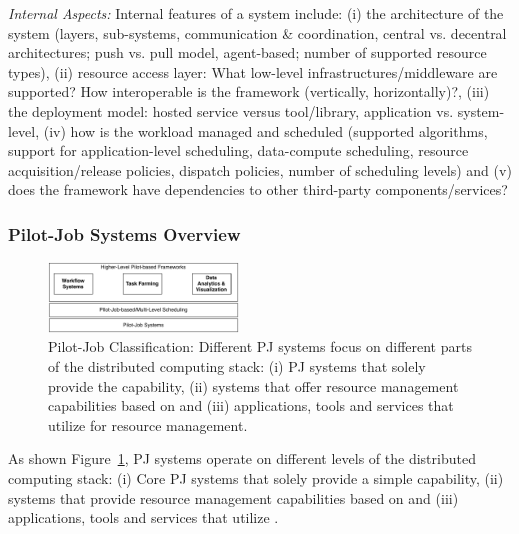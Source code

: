 \documentclass{sig-alternate}
\begin{document}
\emph{Internal Aspects:} Internal features of a \pilotjob system include: (i)
the architecture of the system (layers, sub-systems, communication \&
coordination, central vs. decentral architectures; push vs. pull model,
agent-based; number of supported resource types), (ii) resource access layer:
What low-level infrastructures/middleware are supported? How interoperable is
the framework (vertically, horizontally)?, (iii) the deployment model: hosted
service versus tool/library, application vs. system-level, (iv) how is the
workload managed and scheduled (supported algorithms, support for
application-level scheduling, data-compute scheduling, resource
acquisition/release policies, dispatch policies, number of scheduling levels)
and (v) does the framework have dependencies to other third-party
components/services?



\subsubsection{Pilot-Job Systems Overview}

\begin{figure}[t]
	\centering
		\includegraphics[width=0.45\textwidth]{figures/classification}
	\caption{Pilot-Job Classification: Different PJ systems focus
          on different parts of the distributed computing stack: (i)
          PJ systems that solely provide the \pilot capability, (ii)
          systems that offer resource management capabilities based on
          \pilots and (iii) applications, tools and services that
          utilize \pilots for resource management. }
	\label{fig:figures_classification}
\end{figure}


As shown Figure~\ref{fig:figures_classification}, PJ systems operate
on different levels of the distributed computing stack: (i) Core PJ
systems that solely provide a simple \pilot capability, (ii) systems
that provide resource management capabilities based on \pilots and
(iii) applications, tools and services that utilize
\pilots. 
\end{document}
